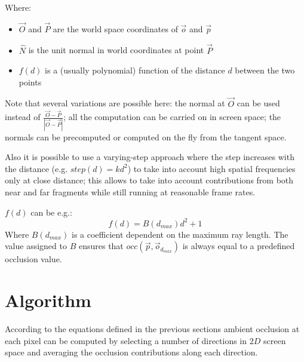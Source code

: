 \documentclass{article}
\begin{document}
Where:
\begin{itemize}
	\item $\vec{O}$ and $\vec{P}$ are the world space coordinates of $\vec{o}$ and $\vec{p}$
	\item $\hat{N}$ is the unit normal in world coordinates at point $\vec{P}$
	\item $f(d)$ is a (usually polynomial) function of the distance $d$ between the two points 
\end{itemize}

Note that several variations are possible here: the normal at $\vec{O}$ can be used instead of 
$\frac{\vec{O}-\vec{P}}{\left|\vec{O} - \vec{P}\right|}$;
all the computation can be carried on in screen space; the normals can be precomputed or computed on the fly
from the tangent space.

Also it is possible to use a varying-step approach where the step increases with the distance (e.g. $step(d)=kd^2$) to take into account high spatial frequencies only at close distance; this allows to take into account contributions from both near and far fragments while still running at reasonable frame rates.

$f(d)$ can be e.g.:
\begin{equation}
f(d) = B(d_{max})d^2 + 1
\end{equation}
Where $B(d_{max})$ is a coefficient dependent on the maximum ray length. The value assigned to $B$ ensures that
$occ(\vec{p}, \vec{o}_{d_{max}})$ is always equal to a predefined occlusion value.  

\section{Algorithm}

According to the equations defined in the previous sections ambient occlusion at each pixel can be
computed by selecting a number of directions in $2D$ screen space and averaging the occlusion contributions
along each direction.
\end{document}
